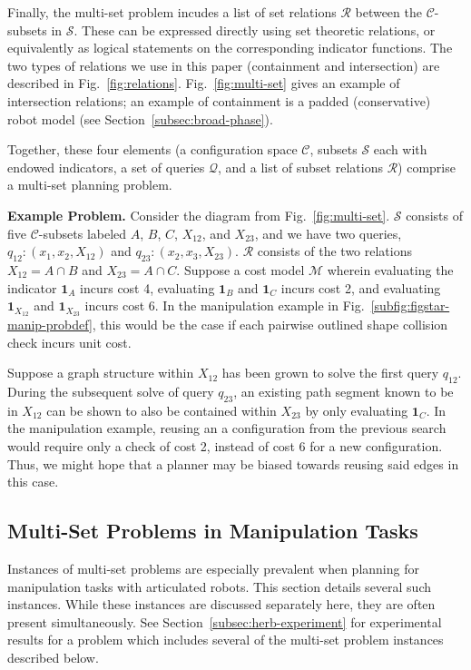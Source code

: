 Finally, the multi-set problem incudes a list of set relations
$\mathcal{R}$
between the $\mathcal{C}$-subsets in $\mathcal{S}$.
These can be expressed directly using set theoretic relations,
or equivalently as logical statements
on the corresponding indicator functions.
The two types of relations we use in this paper
(containment and intersection)
are described in Fig.~\ref{fig:relations}.
Fig.~\ref{fig:multi-set} gives an example of intersection relations;
an example of containment is a padded (conservative)
robot model (see Section~\ref{subsec:broad-phase}).

Together, these four elements
(a configuration space $\mathcal{C}$,
subsets $\mathcal{S}$ each with endowed indicators,
a set of queries $\mathcal{Q}$,
and a list of subset relations $\mathcal{R}$)
comprise a multi-set planning problem.

\textbf{Example Problem.}
Consider the diagram from Fig.~\ref{fig:multi-set}.
$\mathcal{S}$ consists of five $\mathcal{C}$-subsets labeled
$A$, $B$, $C$, $X_{12}$, and $X_{23}$,
and we have two queries,
$q_{12}: (x_1, x_2, X_{12})$
and
$q_{23}: (x_2, x_3, X_{23})$.
$\mathcal{R}$ consists of the two relations
$X_{12} = A \cap B$ and $X_{23} = A \cap C$.
Suppose a cost model $\mathcal{M}$
wherein evaluating the indicator
$\mathbf{1}_A$ incurs cost 4,
evaluating $\mathbf{1}_B$ and $\mathbf{1}_C$ incurs cost 2,
and evaluating $\mathbf{1}_{X_{12}}$ and $\mathbf{1}_{X_{23}}$
incurs cost 6.
In the manipulation example in
Fig.~\ref{subfig:figstar-manip-probdef},
this would be the case if each
pairwise outlined shape collision check incurs unit cost.

Suppose a graph structure within ${X_{12}}$ has been grown to solve
the first query $q_{12}$.
During the subsequent solve of query $q_{23}$,
an existing path segment known to be in ${X_{12}}$ can be shown to
also be contained within ${X_{23}}$ by only evaluating $\mathbf{1}_C$.
In the manipulation example,
reusing an a configuration from the previous search
would require only a check of cost 2,
instead of cost 6 for a new configuration.
Thus, we might hope that a planner may be biased towards reusing
said edges in this case.

\subsection{Multi-Set Problems in Manipulation Tasks}
\label{sec:in-manipulation}

Instances of multi-set problems are especially prevalent when
planning for manipulation tasks with articulated robots.
This section details several such instances.
While these instances are discussed separately here,
they are often present simultaneously.
See Section~\ref{subsec:herb-experiment}
for experimental results for a problem
which includes several of the multi-set problem instances
described below.

